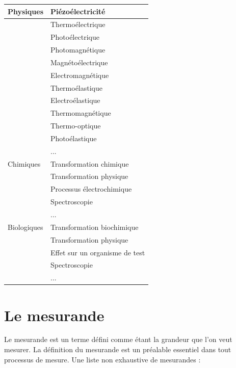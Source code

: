 \begin {center}
\begin{tabular}{|p{4.2cm}|p{9.5cm}|}
\hline
Physiques &	Piézoélectricité \\
\hline
 & 	Thermoélectrique \\
\hline
  &	Photoélectrique \\
\hline
 & 	Photomagnétique \\
\hline
 & 	Magnétoélectrique \\
\hline
 & 	Electromagnétique \\
\hline
 & 	Thermoélastique \\
\hline
 & 	Electroélastique \\
\hline
 & 	Thermomagnétique \\
\hline
 & 	Thermo-optique \\
\hline
 & 	Photoélastique \\
\hline
 & 	... \\
\hline
Chimiques &	Transformation chimique \\
\hline
 & 	Transformation physique \\
\hline
 & 	Processus électrochimique \\
\hline
 & 	Spectroscopie \\
\hline
 & 	... \\
\hline
Biologiques &	Transformation biochimique \\
\hline
 & 	Transformation physique \\
\hline
 & 	Effet sur un organisme de test \\
\hline
 & 	Spectroscopie \\
\hline
 & 	... \\
\hline
\end{tabular}
\end{center}

\section{Le mesurande}
Le mesurande est un terme défini comme étant la grandeur que l'on veut mesurer. La définition du mesurande est un préalable essentiel dans tout processus de mesure. Une liste non exhaustive de mesurandes :

